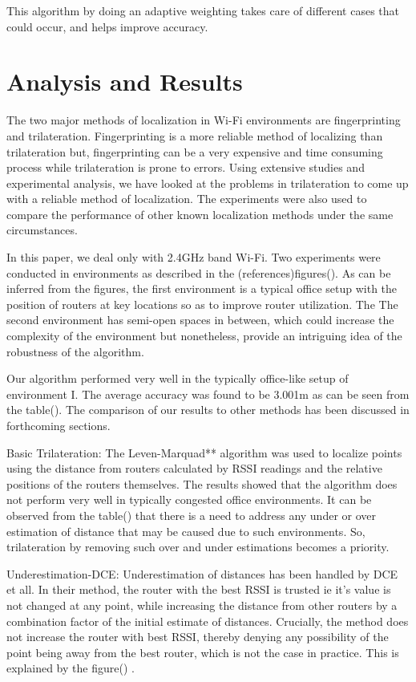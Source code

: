 \documentclass[twocolumn, 11pt]{IEEEtran}
\begin{document}
This algorithm by doing an adaptive weighting takes care of different cases that could occur, and helps improve accuracy.



\section{Analysis and Results}

The two major methods of localization in Wi-Fi environments are fingerprinting and trilateration. Fingerprinting is a more reliable method of localizing than trilateration but, fingerprinting can be a very expensive and time consuming process while trilateration is prone to errors. Using extensive studies and experimental analysis, we have looked at the problems in trilateration to come up with a reliable method of localization. The experiments were also used to compare the performance of other known localization methods under the same circumstances.

In this paper, we deal only with 2.4GHz band Wi-Fi. Two experiments were conducted in environments as described in the (references)figures(). As can be inferred from the figures, the first environment is a typical office setup with the position of routers at key locations so as to improve router utilization. The The second environment has semi-open spaces in between, which could increase the complexity of the environment but nonetheless, provide an intriguing idea of the robustness of the algorithm.


Our algorithm performed very well in the typically office-like setup of environment I. The average accuracy was found to be 3.001m as can be seen from the table(). The comparison of our results to other methods has been discussed in forthcoming sections.

Basic Trilateration:
The Leven-Marquad** algorithm was used to localize points using the distance from routers calculated by RSSI readings and the relative positions of the routers themselves. The results showed that the algorithm does not perform very well in typically congested office environments. It can be observed from the table() that there is a need to address any under or over estimation of distance that may be caused due to such environments. So, trilateration by removing such over and under estimations becomes a priority.

Underestimation-DCE:
Underestimation of distances has been handled by DCE et all. In their method, the router with the best RSSI is trusted ie it's value is not changed at any point, while increasing the distance from other routers by a combination factor of the initial estimate of distances.
Crucially, the method does not increase the router with best RSSI, thereby denying any possibility of the point being away from the best router, which is not the case in practice. This is explained by the figure() .
\end{document}
